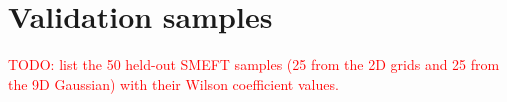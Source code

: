 \section{Validation samples}
\label{sec:appendix_samples}

\textcolor{red}{TODO: list the 50 held-out SMEFT samples (25 from the 2D grids and 25 from the 9D Gaussian) with their Wilson coefficient values.}
